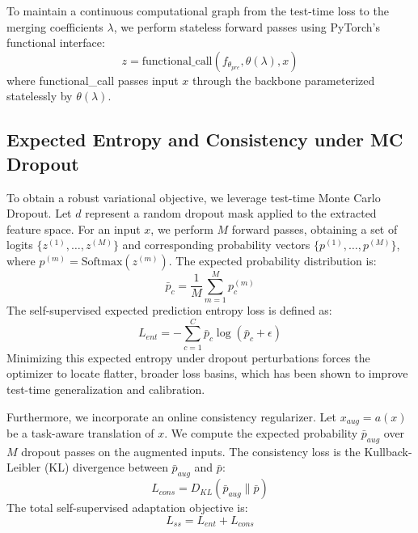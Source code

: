 \documentclass{article}
\theoremstyle{plain}
\theoremstyle{definition}
\theoremstyle{remark}
\begin{document}
To maintain a continuous computational graph from the test-time loss to the merging coefficients $\lambda$, we perform stateless forward passes using PyTorch's functional interface:
\begin{equation}
  z = \text{functional\_call}(f_{\theta_{pre}}, \theta(\lambda), x)
\end{equation}
where functional\_call passes input $x$ through the backbone parameterized statelessly by $\theta(\lambda)$. 

\subsection{Expected Entropy and Consistency under MC Dropout}
To obtain a robust variational objective, we leverage test-time Monte Carlo Dropout. Let $d$ represent a random dropout mask applied to the extracted feature space. For an input $x$, we perform $M$ forward passes, obtaining a set of logits $\{z^{(1)}, \dots, z^{(M)}\}$ and corresponding probability vectors $\{p^{(1)}, \dots, p^{(M)}\}$, where $p^{(m)} = \text{Softmax}(z^{(m)})$. The expected probability distribution is:
\begin{equation}
  \bar{p}_c = \frac{1}{M} \sum_{m=1}^M p_c^{(m)}
\end{equation}
The self-supervised expected prediction entropy loss is defined as:
\begin{equation}
  L_{ent} = - \sum_{c=1}^C \bar{p}_c \log(\bar{p}_c + \epsilon)
\end{equation}
Minimizing this expected entropy under dropout perturbations forces the optimizer to locate flatter, broader loss basins, which has been shown to improve test-time generalization and calibration.

Furthermore, we incorporate an online consistency regularizer. Let $x_{aug} = a(x)$ be a task-aware translation of $x$. We compute the expected probability $\bar{p}_{aug}$ over $M$ dropout passes on the augmented inputs. The consistency loss is the Kullback-Leibler (KL) divergence between $\bar{p}_{aug}$ and $\bar{p}$:
\begin{equation}
  L_{cons} = D_{KL}(\bar{p}_{aug} \parallel \bar{p})
\end{equation}
The total self-supervised adaptation objective is:
\begin{equation}
  L_{ss} = L_{ent} + L_{cons}
\end{equation}
\end{document}
